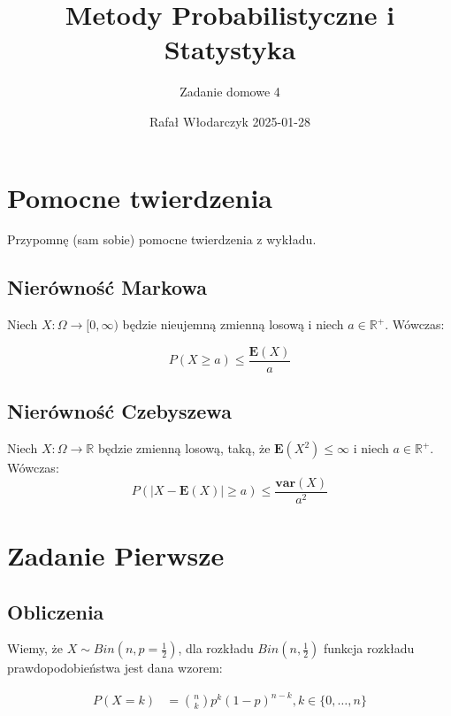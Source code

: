 \documentclass{article}
\title{Metody Probabilistyczne i Statystyka}
\author{Zadanie domowe 4}
\date{Rafał Włodarczyk 2025-01-28}
\newenvironment{theorem}[1]{%
    \trivlist
    \item[\hskip\labelsep\textbf{Theorem. #1.}]
    \ignorespaces
}{%
    \endtrivlist
}
\begin{document}
\maketitle

\tableofcontents

\section{Pomocne twierdzenia}

Przypomnę (sam sobie) pomocne twierdzenia z wykładu.

\subsection{Nierówność Markowa}

\begin{theorem}{Nierówność Markowa} Niech $X: \Omega \rightarrow [0,\infty)$ będzie nieujemną zmienną losową i niech $a\in\mathbb{R}^{+}$. Wówczas:

\[
P(X\geq a) \leq \frac{\mathbf{E}(X)}{a}
\]
\end{theorem}

\subsection{Nierówność Czebyszewa}

\begin{theorem}{Nierówność Czebyszewa} Niech $X: \Omega \rightarrow \mathbb{R}$ będzie zmienną losową, taką, że $\mathbf{E}(X^2) \leq \infty$ i niech $a\in\mathbb{R}^{+}$. Wówczas:
\[
P(|X-\mathbf{E}(X)| \geq a) \leq \frac{\mathbf{var}(X)}{a^2}
\]
\end{theorem}

\section{Zadanie Pierwsze}

\subsection{Obliczenia}

Wiemy, że $X\sim Bin\left(n,p=\frac{1}{2}\right)$, dla rozkładu $Bin\left(n,\frac{1}{2}\right)$ funkcja rozkładu prawdopodobieństwa jest dana wzorem:

\begin{align}
    P(X=k) &= \binom{n}{k}p^k(1-p)^{n-k}, k\in\{0, \dots, n\}\\
\end{align}
\end{document}
